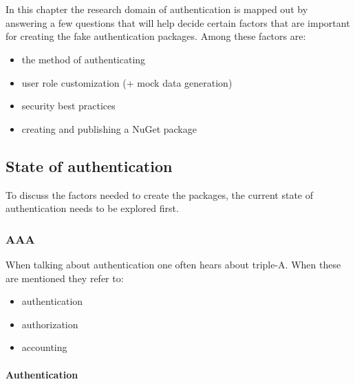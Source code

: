 \chapter{}%
\label{ch:stand-van-zaken}



In this chapter the research domain of authentication is mapped out by answering a few questions that will help decide certain factors that are important for creating the fake authentication packages. Among these factors are:

\begin{itemize}
    \item the method of authenticating
    \item user role customization (+ mock data generation) %
    \item security best practices
    \item creating and publishing a NuGet package
\end{itemize}

\section{State of authentication}

To discuss the factors needed to create the packages, the current state of authentication needs to be explored first.

\subsection{AAA}

When talking about authentication one often hears about triple-A. When these are mentioned they refer to: 

\begin{itemize}
    \item authentication
    \item authorization
    \item accounting
\end{itemize}

\subsubsection{Authentication}

